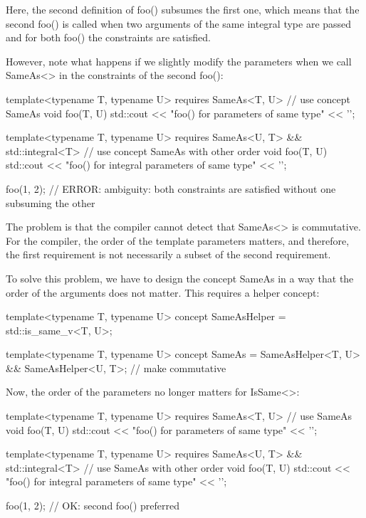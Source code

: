 Here, the second definition of foo() subsumes the first one, which means that the second foo() is called when two arguments of the same integral type are passed and for both foo() the constraints are satisfied.

However, note what happens if we slightly modify the parameters when we call SameAs<> in the constraints of the second foo():

\begin{cpp}
template<typename T, typename U>
requires SameAs<T, U> // use concept SameAs
void foo(T, U)
{
	std::cout << "foo() for parameters of same type" << '\n';
}

template<typename T, typename U>
requires SameAs<U, T> && std::integral<T> // use concept SameAs with other order
void foo(T, U)
{
	std::cout << "foo() for integral parameters of same type" << '\n';
}

foo(1, 2); // ERROR: ambiguity: both constraints are satisfied without one subsuming the other
\end{cpp}

The problem is that the compiler cannot detect that SameAs<> is commutative. For the compiler, the order of the template parameters matters, and therefore, the first requirement is not necessarily a subset of the second requirement.

To solve this problem, we have to design the concept SameAs in a way that the order of the arguments does not matter. This requires a helper concept:

\begin{cpp}
template<typename T, typename U>
concept SameAsHelper = std::is_same_v<T, U>;

template<typename T, typename U>
concept SameAs = SameAsHelper<T, U> && SameAsHelper<U, T>; // make commutative
\end{cpp}

Now, the order of the parameters no longer matters for IsSame<>:


\begin{cpp}
template<typename T, typename U>
requires SameAs<T, U> // use SameAs
void foo(T, U)
{
	std::cout << "foo() for parameters of same type" << '\n';
}

template<typename T, typename U>
requires SameAs<U, T> && std::integral<T> // use SameAs with other order
void foo(T, U)
{
	std::cout << "foo() for integral parameters of same type" << '\n';
}

foo(1, 2); // OK: second foo() preferred
\end{cpp}

